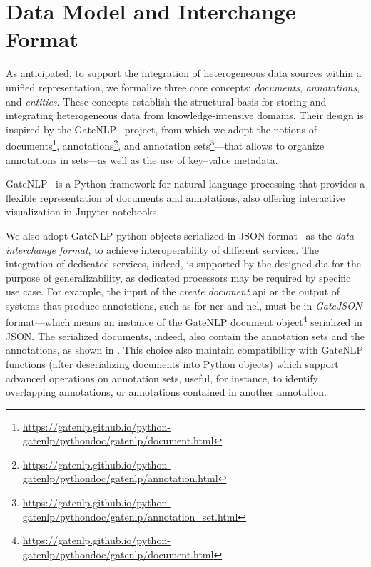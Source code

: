





\section{Data Model and Interchange Format}
\label{sec:arch:datamodel}

As anticipated, to support the integration of heterogeneous data sources within a unified representation, we formalize three core concepts: \emph{documents}, \emph{annotations}, and \emph{entities}. These concepts establish the structural basis for storing and integrating heterogeneous data from knowledge-intensive domains. Their design is inspired by the GateNLP~\cite{cunningham-etal-2002-gate,gatenlp} project, from which we adopt the notions of documents\footnote{\url{https://gatenlp.github.io/python-gatenlp/pythondoc/gatenlp/document.html}}, annotations\footnote{\url{https://gatenlp.github.io/python-gatenlp/pythondoc/gatenlp/annotation.html}}, and annotation sets\footnote{\url{https://gatenlp.github.io/python-gatenlp/pythondoc/gatenlp/annotation_set.html}}---that allows to organize annotations in sets---as well as the use of key--value metadata.

GateNLP~\cite{cunningham-etal-2002-gate,gatenlp} is a Python framework for natural language processing that provides a flexible representation of documents and annotations, also offering interactive visualization in Jupyter notebooks.

We also adopt GateNLP python objects serialized in JSON format~\cite{rfc8259} as the \emph{data interchange format}, to achieve interoperability of different services. The integration of dedicated services, indeed, is supported by the designed \ac{dia} for the purpose of generalizability, as dedicated processors may be required by specific use case.
For example, the input of the \emph{create document} \ac{api} or the output of systems that produce annotations, such as for \acl{ner} and \acl{nel}, must be in \emph{GateJSON} format---which means an instance of the GateNLP document object\footnote{\url{https://gatenlp.github.io/python-gatenlp/pythondoc/gatenlp/document.html}} serialized in JSON. The serialized documents, indeed, also contain the annotation sets and the annotations, as shown in .
This choice also maintain compatibility with GateNLP functions (after deserializing documents into Python objects) which support advanced operations on annotation sets, useful, for instance, to identify overlapping annotations, or annotations contained in another annotation. 

